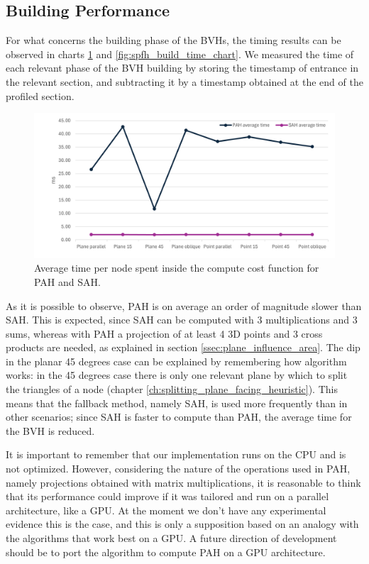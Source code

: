 \documentclass{PoliMi_MasterThesis}
\begin{document}
\subsection{Building Performance} \label{ssec:building_performance}
For what concerns the building phase of the BVHs, the timing results can be observed in charts \ref{fig:pah_build_time_chart} and \ref{fig:spfh_build_time_chart}. We measured the time of each relevant phase of the BVH building by storing the timestamp of entrance in the relevant section, and subtracting it by a timestamp obtained at the end of the profiled section.

\begin{figure}[H] 
	\centering
	\includegraphics[width=\textwidth]{Images/pah_build_time_chart.png}
	\caption{Average time per node spent inside the compute cost function for PAH and SAH.}
	\label{fig:pah_build_time_chart}
\end{figure}

As it is possible to observe, PAH is on average an order of magnitude slower than SAH. This is expected, since SAH can be computed with 3 multiplications and 3 sums, whereas with PAH a projection of at least 4 3D points and 3 cross products are needed, as explained in section \ref{ssec:plane_influence_area}. The dip in the planar 45 degrees case can be explained by remembering how algorithm works: in the 45 degrees case there is only one relevant plane by which to split the triangles of a node (chapter \ref{ch:splitting_plane_facing_heuristic}). This means that the fallback method, namely SAH, is used more frequently than in other scenarios; since SAH is faster to compute than PAH, the average time for the BVH is reduced.

It is important to remember that our implementation runs on the CPU and is not optimized. However, considering the nature of the operations used in PAH, namely projections obtained with matrix multiplications, it is reasonable to think that its performance could improve if it was tailored and run on a parallel architecture, like a GPU. At the moment we don't have any experimental evidence this is the case, and this is only a supposition based on an analogy with the algorithms that work best on a GPU. A future direction of development should be to port the algorithm to compute PAH on a GPU architecture.
\end{document}
